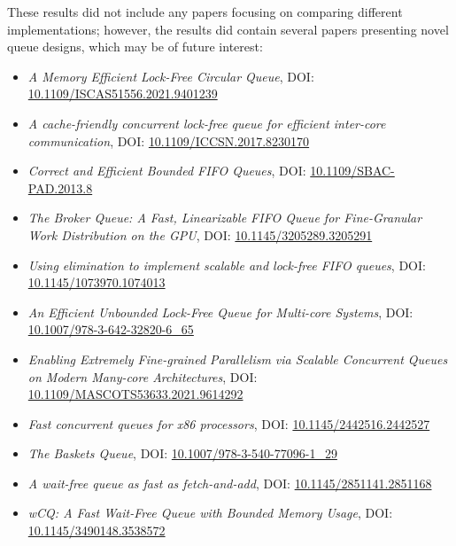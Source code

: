 These results did not include any papers focusing on comparing different implementations;
however, the results did contain several papers presenting novel queue designs, which may be of future interest:
\begin{itemize}
    \item \textit{A Memory Efficient Lock-Free Circular Queue},
        DOI: \href{https://doi.org/10.1109/ISCAS51556.2021.9401239}{10.1109/ISCAS51556.2021.9401239}
    \item \textit{A cache-friendly concurrent lock-free queue for efficient inter-core communication},
        DOI: \href{https://doi.org/10.1109/ICCSN.2017.8230170}{10.1109/ICCSN.2017.8230170}
    \item \textit{Correct and Efficient Bounded FIFO Queues},
        DOI: \href{https://doi.org/10.1109/SBAC-PAD.2013.8}{10.1109/SBAC-PAD.2013.8}
    \item \textit{The Broker Queue: A Fast, Linearizable FIFO Queue for Fine-Granular Work Distribution on the GPU},
        DOI: \href{https://doi.org/10.1145/3205289.3205291}{10.1145/3205289.3205291}
    \item \textit{Using elimination to implement scalable and lock-free FIFO queues},
        DOI: \href{https://doi.org/10.1145/1073970.1074013}{10.1145/1073970.1074013}
    \item \textit{An Efficient Unbounded Lock-Free Queue for Multi-core Systems},
        DOI: \href{https://doi.org/10.1007/978-3-642-32820-6_65}{10.1007/978-3-642-32820-6\_65}
    \item \textit{Enabling Extremely Fine-grained Parallelism via Scalable Concurrent Queues on Modern Many-core Architectures},
        DOI: \href{https://doi.org/10.1109/MASCOTS53633.2021.9614292}{10.1109/MASCOTS53633.2021.9614292}
    \item \textit{Fast concurrent queues for x86 processors},
        DOI: \href{https://doi.org/10.1145/2442516.2442527}{10.1145/2442516.2442527}
    \item \textit{The Baskets Queue},
        DOI: \href{https://doi.org/10.1007/978-3-540-77096-1_29}{10.1007/978-3-540-77096-1\_29}
    \item \textit{A wait-free queue as fast as fetch-and-add},
        DOI: \href{https://doi.org/10.1145/2851141.2851168}{10.1145/2851141.2851168}
    \item \textit{wCQ: A Fast Wait-Free Queue with Bounded Memory Usage},
        DOI: \href{https://doi.org/10.1145/3490148.3538572}{10.1145/3490148.3538572}
\end{itemize}



\printglossary[type=\acronymtype]

{
    \listoffigures

    \let\clearpage\relax
    \let\cleardoublepage\relax

    \listoflistings
}
